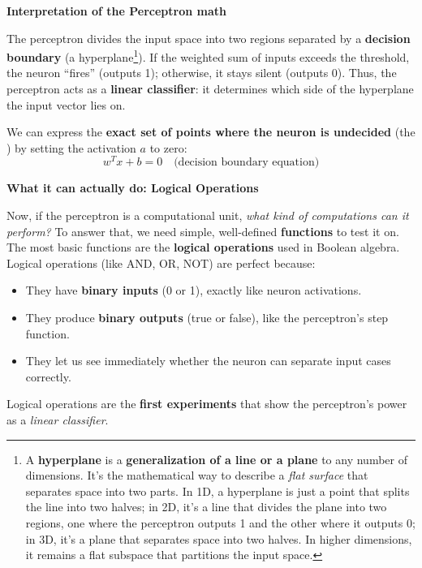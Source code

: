 \highspace
\begin{flushleft}
    \textcolor{Green3}{ \textbf{Interpretation of the Perceptron math}}
\end{flushleft}
The perceptron divides the input space into two regions separated by a \textbf{decision boundary} (a hyperplane\footnote{%
    A \textbf{hyperplane} is a \textbf{generalization of a line or a plane} to any number of dimensions. It's the mathematical way to describe a \emph{flat surface} that separates space into two parts. In 1D, a hyperplane is just a point that splits the line into two halves; in 2D, it's a line that divides the plane into two regions, one where the perceptron outputs 1 and the other where it outputs 0; in 3D, it's a plane that separates space into two halves. In higher dimensions, it remains a flat subspace that partitions the input space.
}). If the weighted sum of inputs exceeds the threshold, the neuron ``fires'' (outputs 1); otherwise, it stays silent (outputs 0). Thus, the perceptron acts as a \textbf{linear classifier}: it determines which side of the hyperplane the input vector lies on.

\highspace
We can express the \textbf{exact set of points where the neuron is undecided} (the ) by setting the activation $a$ to zero:
\begin{equation}
    w^T x + b = 0 \quad \text{(decision boundary equation)}
\end{equation}

\highspace
\begin{flushleft}
    \textcolor{Green3}{ \textbf{What it can actually do: Logical Operations}}
\end{flushleft}
Now, if the perceptron is a computational unit, \emph{what kind of computations can it perform?} To answer that, we need simple, well-defined \textbf{functions} to test it on. The most basic functions are the \textbf{logical operations} used in Boolean algebra. Logical operations (like AND, OR, NOT) are perfect because:
\begin{itemize}
    \item They have \textbf{binary inputs} (0 or 1), exactly like neuron activations.
    \item They produce \textbf{binary outputs} (true or false), like the perceptron's step function.
    \item They let us see immediately whether the neuron can separate input cases correctly.
\end{itemize}
Logical operations are the \textbf{first experiments} that show the perceptron's power as a \emph{linear classifier}.

